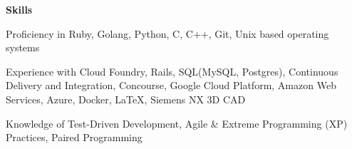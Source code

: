\documentclass[10pt,a4papaer]{article}
\begin{document}
{		\setlength{\leftskip}{0pt}
		
		{\noindent\textbf{Skills}}\vspace*{-20px}\\
		
		\noindent\makebox[\linewidth]{\rule{\textwidth}{1.2pt}}
		
		Proficiency in Ruby, Golang, Python, C, C++, Git, Unix based operating systems\\
		
		\setlength{\leftskip}{15pt}
		
		{\noindent Experience with Cloud Foundry, Rails, SQL(MySQL, Postgres), Continuous Delivery and Integration, Concourse, Google Cloud Platform, Amazon Web Services, Azure, Docker, \LaTeX, Siemens NX 3D CAD}\\
		
		\setlength{\leftskip}{0pt}
		
		Knowledge of Test-Driven Development, Agile \& Extreme Programming (XP) Practices, Paired Programming\\
		
	}
\end{document}

